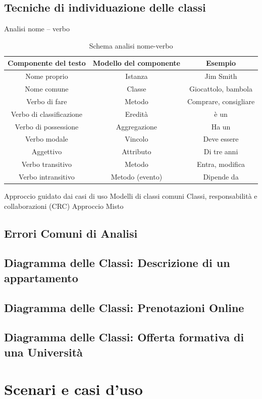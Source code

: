 \documentclass{article}
\begin{document}
	\subsection{Tecniche di individuazione delle classi}
	Analisi nome – verbo
	\begin{table}[h!]
		\centering
		\begin{tabular}{ |c|c|c| } 
			\hline
			\textbf{Componente del testo} & \textbf{Modello del componente} & \textbf{Esempio}\\
			\hline
			Nome proprio & Istanza & Jim Smith\\
			\hline
			Nome comune & Classe &Giocattolo, bambola\\
			\hline
			Verbo di fare & Metodo & Comprare, consigliare\\
			\hline
			Verbo di classificazione & Eredità & è un\\
			\hline
			Verbo di possessione & Aggregazione & Ha un\\
			\hline
			Verbo modale & Vincolo & Deve essere\\
			\hline
			Aggettivo & Attributo & Di tre anni\\
			\hline
			Verbo transitivo & Metodo & Entra, modifica\\
			\hline
			Verbo intransitivo & Metodo (evento) & Dipende da\\
			\hline
		\end{tabular}
		\caption{Schema analisi nome-verbo}
	\end{table}
	Approccio guidato dai casi di uso
	Modelli di classi comuni
	Classi, responsabilità e collaborazioni (CRC)
	Approccio Misto
	\subsection{Errori Comuni di Analisi}
	\subsection{Diagramma delle Classi: Descrizione di un appartamento}
	\subsection{Diagramma delle Classi: Prenotazioni Online}
	\subsection{Diagramma delle Classi: Offerta formativa di una Università}
	
	\section{Scenari e casi d’uso}
\end{document}
